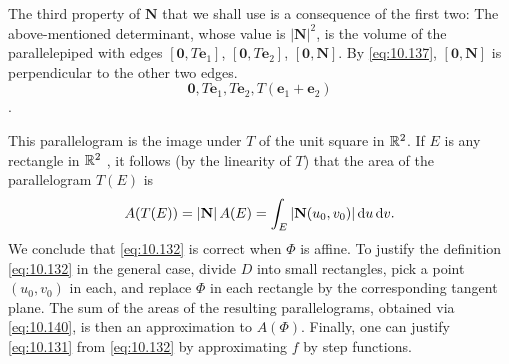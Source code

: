 \begin{mydef}
    The third property of $\mathbf{N}$ that we shall use is a consequence of the first two:
    The above-mentioned determinant, whose value is $|\mathbf{N}|^2$, is the volume of the parallelepiped with edges $[\mathbf{0}, T\mathbf{e}_1]$, $[\mathbf{0}, T\mathbf{e}_2]$, $[\mathbf{0}, \mathbf{N}]$. 
    By \eqref{eq:10.137}, $[\mathbf{0}, \mathbf{N}]$ is perpendicular to the other two edges. 
    \begin{equation}
        \label{eq:10.139}
        \mathbf{0}, 
        T \mathbf{e}_1 ,
        T \mathbf{e}_2 ,
        T (\mathbf{e}_1 + \mathbf{e}_2)
    \end{equation}
    .

    This parallelogram is the image under $T$ of the unit square in ${\protect\mathbb R}^2$. 
    If $E$ is any rectangle in ${\protect\mathbb R}^2$ , it follows 
    (by the linearity of $T$) that the area of the
    parallelogram $T(E)$ is
    \begin{equation}
        \label{eq:10.140}
        A(T(E)) = \left| \mathbf{N} \right| A(E) =
        \int_E \left| \mathbf{N}(u_0,v_0) \right| \d u \d v .
    \end{equation}
    We conclude that \eqref{eq:10.132} is correct when $\Phi$ is affine. 
    To justify the definition \eqref{eq:10.132} in the general case, divide $D$ into small rectangles, pick a point $(u_0, v_0)$ in each, and replace $\Phi$ in each rectangle by the corresponding tangent plane. 
    The sum of the areas of the resulting parallelograms, obtained via \eqref{eq:10.140}, is then an approximation to $A(\Phi)$. 
    Finally, one can justify \eqref{eq:10.131} from \eqref{eq:10.132} by approximating $f$ by step functions.
\end{mydef}

